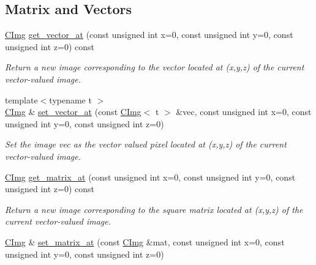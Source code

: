\subsection*{Matrix and Vectors}
\begin{DoxyCompactItemize}
\item 
\hypertarget{structcimg__library_1_1_c_img_a0d2b8a72f62d8e15722f9c4c97c33ebf}{\hyperlink{structcimg__library_1_1_c_img}{C\-Img} \hyperlink{structcimg__library_1_1_c_img_a0d2b8a72f62d8e15722f9c4c97c33ebf}{get\-\_\-vector\-\_\-at} (const unsigned int x=0, const unsigned int y=0, const unsigned int z=0) const }\label{structcimg__library_1_1_c_img_a0d2b8a72f62d8e15722f9c4c97c33ebf}

\begin{DoxyCompactList}\small\item\em Return a new image corresponding to the vector located at ({\ttfamily x},{\ttfamily y},{\ttfamily z}) of the current vector-\/valued image. \end{DoxyCompactList}\item 
\hypertarget{structcimg__library_1_1_c_img_a579ab2aa53e0a77379f6af5c94185eb3}{{\footnotesize template$<$typename t $>$ }\\\hyperlink{structcimg__library_1_1_c_img}{C\-Img} \& \hyperlink{structcimg__library_1_1_c_img_a579ab2aa53e0a77379f6af5c94185eb3}{set\-\_\-vector\-\_\-at} (const \hyperlink{structcimg__library_1_1_c_img}{C\-Img}$<$ t $>$ \&vec, const unsigned int x=0, const unsigned int y=0, const unsigned int z=0)}\label{structcimg__library_1_1_c_img_a579ab2aa53e0a77379f6af5c94185eb3}

\begin{DoxyCompactList}\small\item\em Set the image {\ttfamily vec} as the {\itshape vector} {\itshape valued} pixel located at ({\ttfamily x},{\ttfamily y},{\ttfamily z}) of the current vector-\/valued image. \end{DoxyCompactList}\item 
\hypertarget{structcimg__library_1_1_c_img_a13317c2700b6c7e4cb0567b9ae1f03ab}{\hyperlink{structcimg__library_1_1_c_img}{C\-Img} \hyperlink{structcimg__library_1_1_c_img_a13317c2700b6c7e4cb0567b9ae1f03ab}{get\-\_\-matrix\-\_\-at} (const unsigned int x=0, const unsigned int y=0, const unsigned int z=0) const }\label{structcimg__library_1_1_c_img_a13317c2700b6c7e4cb0567b9ae1f03ab}

\begin{DoxyCompactList}\small\item\em Return a new image corresponding to the {\itshape square} {\itshape matrix} located at ({\ttfamily x},{\ttfamily y},{\ttfamily z}) of the current vector-\/valued image. \end{DoxyCompactList}\item 
\hypertarget{structcimg__library_1_1_c_img_abb5b9b315b398961953518b7ce4d6673}{\hyperlink{structcimg__library_1_1_c_img}{C\-Img} \& \hyperlink{structcimg__library_1_1_c_img_abb5b9b315b398961953518b7ce4d6673}{set\-\_\-matrix\-\_\-at} (const \hyperlink{structcimg__library_1_1_c_img}{C\-Img} \&mat, const unsigned int x=0, const unsigned int y=0, const unsigned int z=0)}\label{structcimg__library_1_1_c_img_abb5b9b315b398961953518b7ce4d6673}


\end{DoxyCompactItemize}
